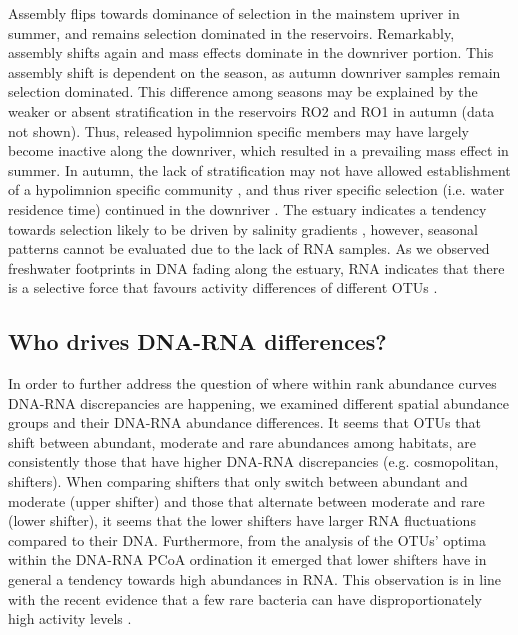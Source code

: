 \documentclass[12pt,a4paper]{article} %
\begin{document}
Assembly flips towards dominance of selection in the mainstem upriver in summer, and remains selection dominated in the reservoirs. Remarkably, assembly shifts again and mass effects dominate in the downriver portion. This assembly shift is dependent on the season, as autumn downriver samples remain selection dominated. This difference among seasons may be explained by the weaker or absent stratification in the reservoirs RO2 and RO1 in autumn (data not shown). Thus, released hypolimnion specific members \citep{Ruiz-Gonzalez2013, Ruiz-Gonzalez2015a} may have largely become inactive along the downriver, which resulted in a prevailing mass effect in summer. In autumn, the lack of stratification may not have allowed establishment of a hypolimnion specific community \citep{Yu2014}, and thus river specific selection (i.e. water residence time) continued in the downriver \citep{Read2015}. The estuary indicates a tendency towards selection likely to be driven by salinity gradients \citep{Bouvier2002, Crump2004}, however, seasonal patterns cannot be evaluated due to the lack of RNA samples. As we observed freshwater footprints in DNA fading along the estuary, RNA indicates that there is a selective force that favours activity differences of different OTUs \citep{Campbell2013}.

\subsection*{Who drives DNA-RNA differences?}
In order to further address the question of where within rank abundance curves DNA-RNA discrepancies are happening, we examined different spatial abundance groups and their DNA-RNA abundance differences. It seems that OTUs that shift between abundant, moderate and rare abundances among habitats, are consistently those that have higher DNA-RNA discrepancies (e.g. cosmopolitan, shifters). When comparing shifters that only switch between abundant and moderate (upper shifter) and those that alternate between moderate and rare (lower shifter), it seems that the lower shifters have larger RNA fluctuations compared to their DNA. Furthermore, from the analysis of the OTUs' optima within the DNA-RNA PCoA ordination it emerged that lower shifters have in general a tendency towards high abundances in RNA. This observation is in line with the recent evidence that a few rare bacteria can have disproportionately high activity levels \citep{Campbell2013, Campbell2011}.
\end{document}
